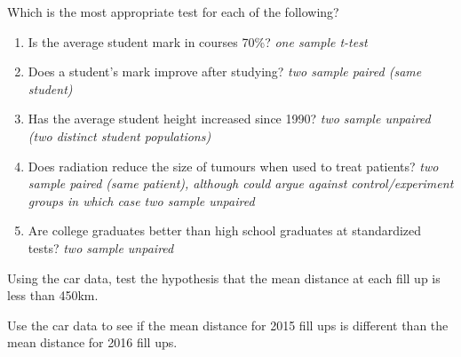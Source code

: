 \documentclass[xcolor=svgnames, 10pt, handout]{beamer}
\begin{document}
\begin{frame}[fragile]\small
\begin{question}
Which is the most appropriate test for each of the following?
\begin{enumerate}
\item Is the average student mark in courses 70\%?  \textit{one sample t-test}
\item Does a student's mark improve after studying?  \textit{two sample paired (same student)}
\item Has the average student height increased since 1990?  \textit{two sample unpaired (two distinct student populations)}
\item Does radiation reduce the size of tumours when used to treat patients?  \textit{two sample paired (same patient), although could argue against control/experiment groups in which case two sample unpaired}
\item Are college graduates better than high school graduates at standardized tests?   \textit{two sample unpaired }

\end{enumerate}
\end{question}
\end{frame}




\begin{frame}[fragile]
\begin{question}
Using the car data, test the hypothesis that the mean distance at each fill up is less than 450km.
\end{question}
\vfill
\begin{question}
Use the car data to see if the mean distance for 2015 fill ups is different than the mean distance for 2016 fill ups.
\end{question}
\end{frame}
\end{document}
